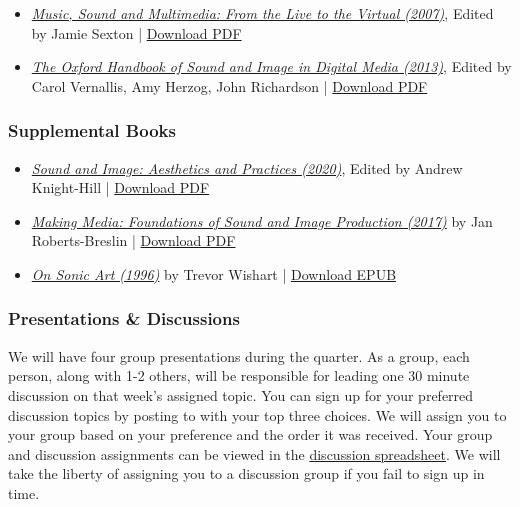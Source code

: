 \begin{itemize}
      \tightlist
      \item \emph{\href{https://books.google.com/books?id=j-iqBgAAQBAJ&newbks=1&newbks_redir=0&source=gbs_navlinks_s}{Music, Sound and Multimedia: From the Live to the Virtual (2007)}}, Edited by Jamie Sexton | \href{supplements/Music_Sound_and_Multimedia_-_From_the_Live_to_the_Virtual_(Music_and_the_Moving_Image)_(2008).pdf}{Download PDF}
      \item \emph{\href{https://books.google.com/books/about/The_Oxford_Handbook_of_Sound_and_Image_i.html?id=XWHSAQAAQBAJ}{The Oxford Handbook of Sound and Image in Digital Media (2013)}}, Edited by Carol Vernallis, Amy Herzog, John Richardson | \href{supplements/The_Oxford_Handbook_of_Sound_and_Image_in_Digital_Media_(2013).pdf}{Download PDF}
\end{itemize}

\subsubsection{Supplemental Books}

\begin{itemize}
      \tightlist
      \item \emph{\href{https://books.google.com/books/about/Sound_and_Image.html?id=-wpUzQEACAAJ}{Sound and Image: Aesthetics and Practices (2020)}}, Edited by Andrew Knight-Hill | \href{supplements/Sound_and_Image_-_Aesthetics_and_Practices_(Sound_Design)_(2020).pdf}{Download PDF}
      \item \emph{\href{https://books.google.com/books?id=aGYPEAAAQBAJ&newbks=1&newbks_redir=0&source=gbs_navlinks_s}{Making Media: Foundations of Sound and Image Production (2017)}} by Jan Roberts-Breslin | \href{supplements/Making_Media_-_Foundations_of_Sound_and_Image_Production_(2003).pdf}{Download PDF}
      \item \emph{\href{https://books.google.com/books?id=KbYyDQAAQBAJ&dq=On_Sonic_Art_(Contemporary_Music_Studies)_(2002)&source=gbs_navlinks_s}{On Sonic Art (1996)}} by Trevor Wishart | \href{supplements/On_Sonic_Art_(Contemporary_Music_Studies)_(2002).epub}{Download EPUB}
\end{itemize}

\subsubsection{Presentations \& Discussions}

We will have four group presentations during the quarter. As a group, each person, along with 1-2 others, will be responsible for leading one 30 minute discussion on that week's assigned topic. You can sign up for your preferred discussion topics by posting to  with your top three choices. We will assign you to your group based on your preference and the order it was received. Your group and discussion assignments can be viewed in the \href{https://docs.google.com/spreadsheets/d/1Fw-DHUMtnCnlHasDcXCUGjx8n23QxS_RaPrshLq49R0/edit?usp=sharing}{discussion spreadsheet}. We will take the liberty of assigning you to a discussion group if you fail to sign up in time.

